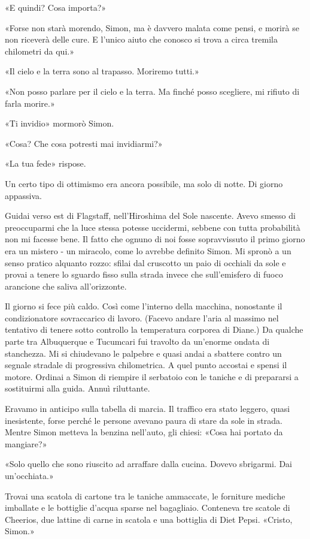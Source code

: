«E quindi? Cosa importa?»

«Forse non starà morendo, Simon, ma è davvero malata come pensi, e
morirà se non riceverà delle cure. E l'unico aiuto che conosco si trova
a circa tremila chilometri da qui.»

«Il cielo e la terra sono al trapasso. Moriremo tutti.»

«Non posso parlare per il cielo e la terra. Ma finché posso scegliere,
mi rifiuto di farla morire.»

«Ti invidio» mormorò Simon.

«Cosa? Che cosa potresti mai invidiarmi?»

«La tua fede» rispose.

\separatorefiori

Un certo tipo di ottimismo era ancora possibile, ma solo di notte. Di
giorno appassiva.

Guidai verso est di Flagstaff, nell'Hiroshima del Sole nascente. Avevo
smesso di preoccuparmi che la luce stessa potesse uccidermi, sebbene con
tutta probabilità non mi facesse bene. Il fatto che ognuno di noi fosse
sopravvissuto il primo giorno era un mistero - un miracolo, come lo
avrebbe definito Simon. Mi spronò a un senso pratico alquanto rozzo:
sfilai dal cruscotto un paio di occhiali da sole e provai a tenere lo
sguardo fisso sulla strada invece che sull'emisfero di fuoco arancione
che saliva all'orizzonte.

Il giorno si fece più caldo. Così come l'interno della macchina,
nonostante il condizionatore sovraccarico di lavoro. (Facevo andare
l'aria al massimo nel tentativo di tenere sotto controllo la temperatura
corporea di Diane.) Da qualche parte tra Albuquerque e Tucumcari fui
travolto da un'enorme ondata di stanchezza. Mi si chiudevano le palpebre
e quasi andai a sbattere contro un segnale stradale di progressiva
chilometrica. A quel punto accostai e spensi il motore. Ordinai a Simon
di riempire il serbatoio con le taniche e di prepararsi a sostituirmi
alla guida. Annuì riluttante.

Eravamo in anticipo sulla tabella di marcia. Il traffico era stato
leggero, quasi inesistente, forse perché le persone avevano paura di
stare da sole in strada. Mentre Simon metteva la benzina nell'auto, gli
chiesi: «Cosa hai portato da mangiare?»

«Solo quello che sono riuscito ad arraffare dalla cucina. Dovevo
sbrigarmi. Dai un'occhiata.»

Trovai una scatola di cartone tra le taniche ammaccate, le forniture
mediche imballate e le bottiglie d'acqua sparse nel bagagliaio.
Conteneva tre scatole di Cheerios, due lattine di carne in scatola e una
bottiglia di Diet Pepsi. «Cristo, Simon.»

